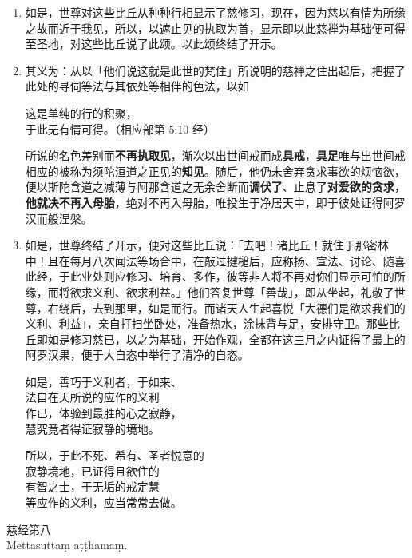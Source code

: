 \begin{enumerate}\item 如是，世尊对这些比丘从种种行相显示了慈修习，现在，因为慈以有情为所缘之故而近于我见，所以，以遮止见的执取为首，显示即以此慈禅为基础便可得至圣地，对这些比丘说了此颂。以此颂终结了开示。
\item 其义为：从以「他们说这就是此世的梵住」所说明的慈禅之住出起后，把握了此处的寻伺等法与其依处等相伴的色法，以如\begin{quoting}这是单纯的行的积聚，\\于此无有情可得。（相应部第 5:10 经）\end{quoting}所说的名色差别而\textbf{不再执取见}，渐次以出世间戒而成\textbf{具戒}，\textbf{具足}唯与出世间戒相应的被称为须陀洹道之正见的\textbf{知见}。随后，他仍未舍弃贪求事欲的烦恼欲，便以斯陀含道之减薄与阿那含道之无余舍断而\textbf{调伏了}、止息了\textbf{对爱欲的贪求}，\textbf{他就决不再入母胎}，绝对不再入母胎，唯投生于净居天中，即于彼处证得阿罗汉而般涅槃。
\item 如是，世尊终结了开示，便对这些比丘说：「去吧！诸比丘！就住于那密林中！且在每月八次闻法等场合中，在敲过揵槌后，应称扬、宣法、讨论、随喜此经，于此业处则应修习、培育、多作，彼等非人将不再对你们显示可怕的所缘，而将欲求义利、欲求利益。」他们答复世尊「善哉」，即从坐起，礼敬了世尊，右绕后，去到那里，如是而行。而诸天人生起喜悦「大德们是欲求我们的义利、利益」，亲自打扫坐卧处，准备热水，涂抹背与足，安排守卫。那些比丘即如是修习慈已，以之为基础，开始作观，全都在这三月之内证得了最上的阿罗汉果，便于大自恣中举行了清净的自恣。\begin{quoting}如是，善巧于义利者，于如来、\\法自在天所说的应作的义利\\作已，体验到最胜的心之寂静，\\慧究竟者得证寂静的境地。\end{quoting}\begin{quoting}所以，于此不死、希有、圣者悦意的\\寂静境地，已证得且欲住的\\有智之士，于无垢的戒定慧\\等应作的义利，应当常常去做。\end{quoting}\end{enumerate}

\begin{center}\vspace{1em}慈经第八\\Mettasuttaṃ aṭṭhamaṃ.\end{center}

